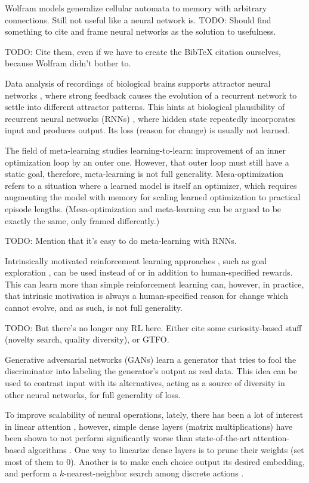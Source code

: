 \documentclass{article}
\begin{document}
Wolfram models generalize cellular automata to memory with arbitrary connections. Still not useful like a neural network is. TODO: Should find something to cite and frame neural networks as the solution to usefulness.

    TODO: Cite them, even if we have to create the BibTeX citation ourselves, because Wolfram didn't bother to.

Data analysis of recordings of biological brains supports attractor neural networks \cite{AMIT1990111}, where strong feedback causes the evolution of a recurrent network to settle into different attractor patterns. This hints at biological plausibility of recurrent neural networks (RNNs) \cite{1986Natur.323.533R}, where hidden state repeatedly incorporates input and produces output. Its loss (reason for change) is usually not learned.

The field of meta-learning studies learning-to-learn: improvement of an inner optimization loop by an outer one. However, that outer loop must still have a static goal, therefore, meta-learning is not full generality. Mesa-optimization \cite{hubinger2019risks} refers to a situation where a learned model is itself an optimizer, which requires augmenting the model with memory for scaling learned optimization to practical episode lengths. (Mesa-optimization and meta-learning can be argued to be exactly the same, only framed differently.)

     TODO: Mention that it's easy to do meta-learning with RNNs.

Intrinsically motivated reinforcement learning approaches \cite{6294131}, such as goal exploration \cite{DBLP:journals/corr/abs-1708-02190}, can be used instead of or in addition to human-specified rewards. This can learn more than simple reinforcement learning can, however, in practice, that intrinsic motivation is always a human-specified reason for change which cannot evolve, and as such, is not full generality.

    TODO: But there's no longer any RL here. Either cite some curiosity-based stuff (novelty search, quality diversity), or GTFO.

Generative adversarial networks (GANs) \cite{goodfellow2014generative} learn a generator that tries to fool the discriminator into labeling the generator's output as real data. This idea can be used to contrast input with its alternatives, acting as a source of diversity in other neural networks, for full generality of loss.

To improve scalability of neural operations, lately, there has been a lot of interest in linear attention \cite{schlag2021linear}, however, simple dense layers (matrix multiplications) have been shown to not perform significantly worse than state-of-the-art attention-based algorithms \cite{tolstikhin2021mlpmixer}. One way to linearize dense layers is to prune their weights \cite{zhou2021effective} (set most of them to $0$). Another is to make each choice output its desired embedding, and perform a $k$-nearest-neighbor search among discrete actions \cite{DBLP:journals/corr/Dulac-ArnoldESC15}.
\end{document}
